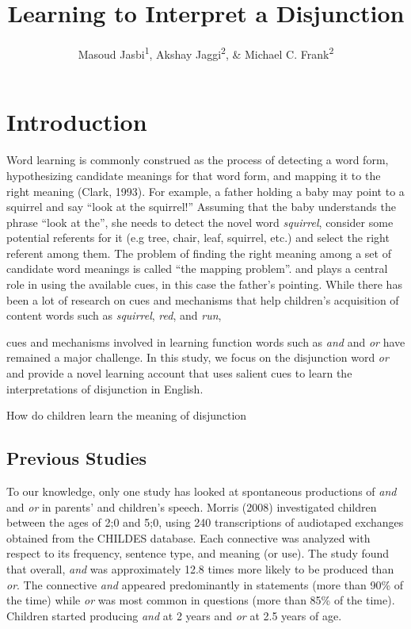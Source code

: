 \documentclass[,man,floatsintext]{apa6}
\title{Learning to Interpret a Disjunction}
\author{Masoud Jasbi\textsuperscript{1}, Akshay Jaggi\textsuperscript{2}, \& Michael C. Frank\textsuperscript{2}}
\date{}
\affiliation{
\vspace{0.5cm}
\textsuperscript{1} Harvard University\\\textsuperscript{2} Stanford University}
\begin{document}
\maketitle

\hypertarget{introduction}{%
\section{Introduction}\label{introduction}}

Word learning is commonly construed as the process of detecting a word form, hypothesizing candidate meanings for that word form, and mapping it to the right meaning (Clark, 1993). For example, a father holding a baby may point to a squirrel and say \enquote{look at the squirrel!} Assuming that the baby understands the phrase \enquote{look at the}, she needs to detect the novel word \emph{squirrel}, consider some potential referents for it (e.g tree, chair, leaf, squirrel, etc.) and select the right referent among them. The problem of finding the right meaning among a set of candidate word meanings is called \enquote{the mapping problem}. and plays a central role in using the available cues, in this case the father's pointing. While there has been a lot of research on cues and mechanisms that help children's acquisition of content words such as \emph{squirrel}, \emph{red}, and \emph{run},

cues and mechanisms involved in learning function words such as \emph{and} and \emph{or} have remained a major challenge. In this study, we focus on the disjunction word \emph{or} and provide a novel learning account that uses salient cues to learn the interpretations of disjunction in English.

How do children learn the meaning of disjunction

\hypertarget{previous-studies}{%
\subsection{Previous Studies}\label{previous-studies}}

To our knowledge, only one study has looked at spontaneous productions of \emph{and} and \emph{or} in parents' and children's speech. Morris (2008) investigated children between the ages of 2;0 and 5;0, using 240 transcriptions of audiotaped exchanges obtained from the CHILDES database. Each connective was analyzed with respect to its frequency, sentence type, and meaning (or use). The study found that overall, \emph{and} was approximately 12.8 times more likely to be produced than \emph{or}. The connective \emph{and} appeared predominantly in statements (more than 90\% of the time) while \emph{or} was most common in questions (more than 85\% of the time). Children started producing \emph{and} at 2 years and \emph{or} at 2.5 years of age.
\end{document}
